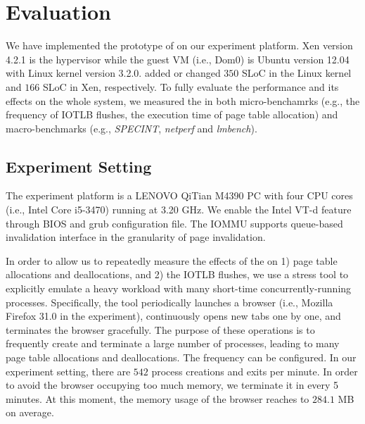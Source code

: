\section{Evaluation} \label{sec:eva}
We have implemented the prototype of \name on our experiment platform.
Xen version 4.2.1 is the hypervisor while the guest VM (i.e., Dom0) is Ubuntu version 12.04 with Linux kernel version 3.2.0.
\name added or changed $350$ SLoC in the Linux kernel and $166$ SLoC in Xen, respectively. 
To fully evaluate the performance and its effects on the whole system, we measured the \name in both micro-benchamrks (e.g., the frequency of IOTLB flushes, the execution time of page table allocation) and macro-benchmarks (e.g., \emph{SPECINT}, \emph{netperf} and \emph{lmbench}).

\subsection{Experiment Setting}
The experiment platform is a LENOVO QiTian M4390 PC with four CPU cores (i.e., Intel Core i5-3470) running at 3.20 GHz.
We enable the Intel VT-d feature through BIOS and grub configuration file. The IOMMU supports queue-based invalidation interface in the granularity of page invalidation.


In order to allow us to repeatedly measure the effects of the \name on 1) page table allocations and deallocations, and 2) the IOTLB flushes, we use a stress tool to explicitly emulate a heavy workload with many short-time concurrently-running processes.
Specifically, the tool periodically launches a browser (i.e., Mozilla Firefox 31.0 in the experiment), continuously opens new tabs one by one, and terminates the browser gracefully.
The purpose of these operations is to frequently create and terminate a large number of processes, leading to many page table allocations and deallocations.
The frequency can be configured. In our experiment setting, there are $542$ process creations and exits per minute.
In order to avoid the browser occupying too much memory, we terminate it in every 5 minutes.
At this moment, the memory usage of the browser reaches to $284.1$ MB on average.

